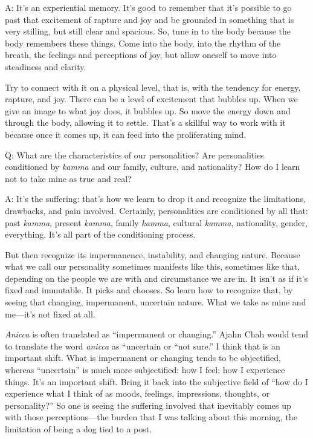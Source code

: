 \qaspace
A: It’s an experiential memory. It’s good to remember that it’s possible
to go past that excitement of rapture and joy and be grounded in
something that is very stilling, but still clear and spacious. So, tune
in to the body because the body remembers these things. Come into the
body, into the rhythm of the breath, the feelings and perceptions of
joy, but allow oneself to move into steadiness and clarity.

Try to connect with it on a physical level, that is, with the tendency
for energy, rapture, and joy. There can be a level of excitement that
bubbles up. When we give an image to what joy does, it bubbles up. So
move the energy down and through the body, allowing it to settle. That’s
a skillful way to work with it because once it comes up, it can feed
into the proliferating mind.

\qaspace
Q: What are the characteristics of our personalities? Are personalities
conditioned by \emph{kamma} and our family, culture, and nationality?
How do I learn not to take mine as true and real?

\qaspace
A: It’s the suffering: that’s how we learn to drop it and recognize the
limitations, drawbacks, and pain involved. Certainly, personalities are
conditioned by all that: past \emph{kamma}, present \emph{kamma}, family
\emph{kamma}, cultural \emph{kamma}, nationality, gender, everything.
It’s all part of the conditioning process.

But then recognize its impermanence, instability, and changing nature.
Because what we call our personality sometimes manifests like this,
sometimes like that, depending on the people we are with and
circumstance we are in. It isn’t as if it’s fixed and immutable. It
picks and chooses. So learn how to recognize that, by seeing that
changing, impermanent, uncertain nature. What we take as mine and
me—it’s not fixed at all.

\emph{Anicca} is often translated as “impermanent or changing.” Ajahn
Chah would tend to translate the word \emph{anicca} as “uncertain or
“not sure.” I think that is an important shift. What is impermanent or
changing tends to be objectified, whereas “uncertain” is much more
subjectified: how I feel; how I experience things. It’s an important
shift. Bring it back into the subjective field of “how do I experience
what I think of as moods, feelings, impressions, thoughts, or
personality?” So one is seeing the suffering involved that inevitably
comes up with those perceptions—the burden that I was talking about this
morning, the limitation of being a dog tied to a post.

